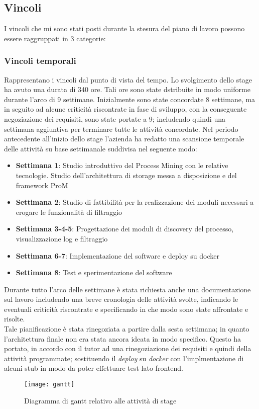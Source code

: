 \subsection{Vincoli}
I vincoli che mi sono stati posti durante la stesura del piano di lavoro possono essere raggruppati in 3 categorie:
\subsubsection{Vincoli temporali}
Rappresentano i vincoli dal punto di vista del tempo. Lo svolgimento dello stage ha avuto una durata di 340 ore. Tali ore sono state dstribuite in modo uniforme durante l'arco di 9 settimane. Inizialmente sono state concordate 8 settimane, ma in seguito ad alcune criticità riscontrate in fase di sviluppo, con la conseguente negoziazione dei requisiti, sono state portate a 9; includendo quindi una settimana aggiuntiva per terminare tutte le attività concordate.
Nel periodo antecedente all'inizio dello stage l'azienda ha redatto una scansione temporale delle attività su base settimanale suddivisa nel seguente modo:
\begin{itemize}
	\item \textbf{Settimana 1}: Studio introduttivo del Process Mining con le relative tecnologie. Studio dell’architettura di storage messa a disposizione e del	framework ProM
	\item \textbf{Settimana 2}: Studio di fattibilità per la realizzazione dei moduli necessari a erogare le funzionalità di filtraggio
    \item \textbf{Settimana 3-4-5}: Progettazione dei moduli di discovery del processo, visualizzazione log e filtraggio
    \item \textbf{Settimana 6-7}: Implementazione del software e deploy su docker
    \item \textbf{Settimana 8}: Test e sperimentazione del software
\end{itemize}
Durante tutto l'arco delle settimane è stata richiesta anche una documentazione sul lavoro includendo una breve cronologia delle attività svolte, indicando le eventuali criticità riscontrate e specificando in che modo sono state affrontate e risolte.\\
Tale pianificazione è stata rinegoziata a partire dalla sesta settimana; in quanto l'architettura finale non era stata ancora ideata in modo specifico. Questo ha portato, in accordo con il tutor ad una rinegoziazione dei requisiti e quindi della attività programmate; sostituendo il \textit{deploy} su \textit{docker} con l'implmentazione di alcuni stub in modo da poter effettuare test lato frontend.
\begin{figure}[!h] 
	\centering 
	\texttt{[image: gantt]} 
	\caption{Diagramma di gantt relativo alle attività di stage}
\end{figure}
